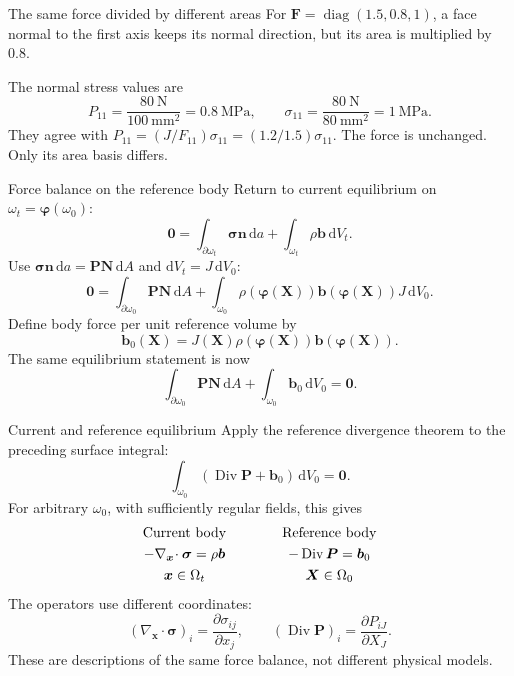 \documentclass[11pt,aspectratio=169]{beamer}
\newcommand{\bx}{\bm x}
\newcommand{\bX}{\bm X}
\newcommand{\bn}{\bm n}
\newcommand{\bN}{\bm N}
\newcommand{\bb}{\bm b}
\newcommand{\bF}{\bm F}
\newcommand{\bP}{\bm P}
\newcommand{\bsig}{\bm\sigma}
\newcommand{\bphi}{\bm\varphi}
\newcommand{\Div}{\operatorname{Div}}
\DeclareMathOperator{\diag}{diag}
\begin{document}
\begin{frame}{The same force divided by different areas}
For $\bF=\diag(1.5,0.8,1)$, a face normal to the first axis keeps its normal
direction, but its area is multiplied by $0.8$.
\begin{center}
\end{center}
The normal stress values are
\[
P_{11}=\frac{80\ \mathrm N}{100\ \mathrm{mm}^2}=0.8\ \mathrm{MPa},
\qquad
\sigma_{11}=\frac{80\ \mathrm N}{80\ \mathrm{mm}^2}=1\ \mathrm{MPa}.
\]
They agree with $P_{11}=(J/F_{11})\sigma_{11}
=(1.2/1.5)\sigma_{11}$.
The force is unchanged. Only its area basis differs.
\end{frame}

\begin{frame}{Force balance on the reference body}
Return to current equilibrium on $\omega_t=\bphi(\omega_0)$:
\[
\bm0=
\int_{\partial\omega_t}\bsig\bn\,\mathrm da
+\int_{\omega_t}\rho\bb\,\mathrm dV_t.
\]
Use $\bsig\bn\,\mathrm da=\bP\bN\,\mathrm dA$ and
$\mathrm dV_t=J\,\mathrm dV_0$:
\[
\bm0=
\int_{\partial\omega_0}\bP\bN\,\mathrm dA
+\int_{\omega_0}\rho(\bphi(\bX))\bb(\bphi(\bX))J\,\mathrm dV_0.
\]
Define body force per unit reference volume by
\[
\bb_0(\bX)=J(\bX)\rho(\bphi(\bX))\bb(\bphi(\bX)).
\]
The same equilibrium statement is now
\[
\boxed{
\int_{\partial\omega_0}\bP\bN\,\mathrm dA
+\int_{\omega_0}\bb_0\,\mathrm dV_0=\bm0.
}
\]
\end{frame}

\begin{frame}{Current and reference equilibrium}
Apply the reference divergence theorem to the preceding surface integral:
\[
\int_{\omega_0}(\Div\bP+\bb_0)\,\mathrm dV_0=\bm0.
\]
For arbitrary $\omega_0$, with sufficiently regular fields, this gives
\[
\begin{array}{c@{\qquad\qquad}c}
\text{Current body}&\text{Reference body}\\[.3em]
-\nabla_{\bx}\!\cdot\bsig=\rho\bb
&
-\Div\bP=\bb_0\\[.3em]
\bx\in\Omega_t
&
\bX\in\Omega_0
\end{array}
\]
The operators use different coordinates:
\[
(\nabla_{\bx}\!\cdot\bsig)_i
=\frac{\partial\sigma_{ij}}{\partial x_j},
\qquad
(\Div\bP)_i=\frac{\partial P_{iJ}}{\partial X_J}.
\]
These are descriptions of the same force balance, not different physical models.
\end{frame}
\end{document}
